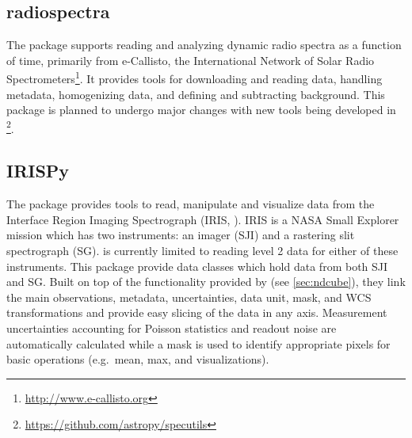 \subsection{radiospectra}
The  package supports reading and analyzing dynamic radio spectra as a function of time, primarily from e-Callisto, the International Network of Solar Radio Spectrometers\footnote{\url{http://www.e-callisto.org}}.
It provides tools for downloading and reading data, handling metadata, homogenizing data, and defining and subtracting background.
This package is planned to undergo major changes with new tools being developed in \footnote{\url{https://github.com/astropy/specutils}}.

\subsection{IRISPy}
\label{sec:irispy}

The  package provides tools to read, manipulate and visualize data from the Interface Region Imaging Spectrograph (IRIS, \citealt{DePontieu2014}).
IRIS is a NASA Small Explorer mission which has two instruments: an imager (SJI) and a rastering slit spectrograph (SG).
 is currently limited to reading level 2 data for either of these instruments.
This package provide data classes which hold data from both SJI and SG.
Built on top of the functionality provided by  (see \autoref{sec:ndcube}), they link the main observations, metadata, uncertainties, data unit, mask, and WCS transformations and provide easy slicing of the data in any axis.
Measurement uncertainties accounting for Poisson statistics and readout noise are automatically calculated while a mask is used to identify appropriate pixels for basic operations (e.g.\ mean, max, and visualizations).
